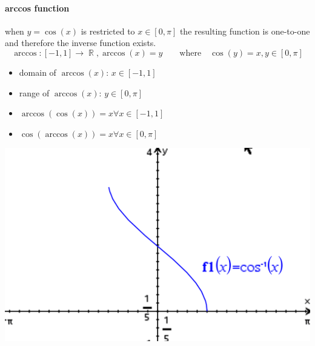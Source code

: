 \documentclass[a4paper,twoside,10pt]{article}
\DeclareMathOperator\R{\mathbb{R}}
\begin{document}
			\paragraph{arccos function} when $y=\cos(x)$ is restricted to $x\in[0,\pi]$ the resulting function is one-to-one and therefore the inverse function exists.
			\[
				\arccos: [-1,1]\to\R,\arccos(x)=y\qquad\text{where}\quad\cos(y)=x,y\in[0,\pi]
			\]
			\begin{minipage}{0.5\textwidth}
				\begin{itemize}
					\item domain of $\arccos(x)$: $x\in[-1,1]$
					\item range of $\arccos(x)$: $y\in[0,\pi]$
					\item $\arccos(\cos(x))=x\forall x\in[-1,1]$
					\item $\cos(\arccos(x))=x\forall x\in[0,\pi]$
				\end{itemize}
			\end{minipage}
			\hfill
			\begin{minipage}{0.4\textwidth}
				\includegraphics[width=\linewidth]{arccos.png}
			\end{minipage}
		
\end{document}
